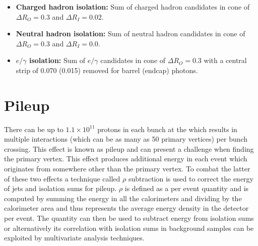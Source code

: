 \begin{itemize}
  \item{\textbf{Charged hadron isolation:} Sum of charged hadron \PF candidates \ET in cone of $\Delta R_{O}=0.3$ and $\Delta R_{I}=0.02$.} 
  \item{\textbf{Neutral hadron isolation:} Sum of neutral hadron \PF candidates \ET in cone of $\Delta R_{O}=0.3$ and $\Delta R_{I}=0.0$.}
  \item{\textbf{$e/\gamma$ isolation:} Sum of $e/\gamma$ \PF candidates \ET in cone of $\Delta R_{O}=0.3$ with a central \eta strip of 0.070 (0.015) removed for barrel (endcap) photons.}
\end{itemize}

\section{Pileup}
\label{sec:pileup}

There can be up to $1.1\times10^{11}$ protons in each bunch at the \LHC which results in multiple interactions (which can be as many as 50 primary vertices) per bunch crossing. This effect is known as pileup and can present a challenge when finding the primary vertex. This effect produces additional energy in each event which originates from somewhere other than the primary vertex. To combat the latter of these two effects a technique called $\rho$ subtraction is used to correct the energy of jets and isolation sums for pileup. $\rho$ is defined as a per event quantity and is computed by summing the energy in all the calorimeters and dividing by the calorimeter area and thus represents the average energy density in the detector per event. The quantity \rho can then be used to subtract energy from isolation sums or alternatively its correlation with isolation sums in background samples can be exploited by multivariate analysis techniques.




